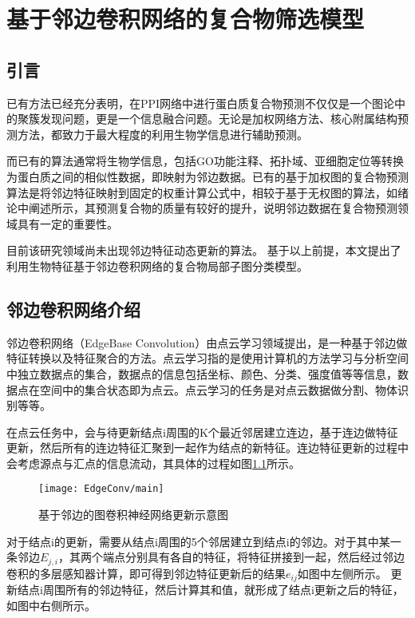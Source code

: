 \chapter{基于邻边卷积网络的复合物筛选模型}
\label{chapter:EdgeConv}
\section{引言}
\label{section:EdgeConv:Put}

已有方法已经充分表明，在PPI网络中进行蛋白质复合物预测不仅仅是一个图论中的聚簇发现问题，更是一个信息融合问题。无论是加权网络方法、核心附属结构预测方法，都致力于最大程度的利用生物学信息进行辅助预测。

而已有的算法通常将生物学信息，包括GO功能注释、拓扑域、亚细胞定位等转换为蛋白质之间的相似性数据，即映射为邻边数据。已有的基于加权图的复合物预测算法是将邻边特征映射到固定的权重计算公式中，相较于基于无权图的算法，如绪论中阐述所示，其预测复合物的质量有较好的提升，说明邻边数据在复合物预测领域具有一定的重要性。

目前该研究领域尚未出现邻边特征动态更新的算法。
基于以上前提，本文提出了利用生物特征基于邻边卷积网络的复合物局部子图分类模型。

\section{邻边卷积网络介绍}
\label{section:EdgeConv:intro}

邻边卷积网络（EdgeBase Convolution）由点云学习领域提出，是一种基于邻边做特征转换以及特征聚合的方法。点云学习指的是使用计算机的方法学习与分析空间中独立数据点的集合，数据点的信息包括坐标、颜色、分类、强度值等等信息，数据点在空间中的集合状态即为点云。点云学习的任务是对点云数据做分割、物体识别等等。

在点云任务中，会与待更新结点i周围的K个最近邻居建立连边，基于连边做特征更新，然后所有的连边特征汇聚到一起作为结点的新特征。连边特征更新的过程中会考虑源点与汇点的信息流动，其具体的过程如图\ref{fig:EdgeConv/main}所示。
\begin{figure}[htbp]
    \centering
    \texttt{[image: EdgeConv/main]}
    \caption{基于邻边的图卷积神经网络更新示意图}
    \label{fig:EdgeConv/main}
\end{figure}
对于结点i的更新，需要从结点i周围的5个邻居建立到结点i的邻边。对于其中某一条邻边$E_{j,i}$，其两个端点分别具有各自的特征，将特征拼接到一起，然后经过邻边卷积的多层感知器计算，即可得到邻边特征更新后的结果$e_{ij}$如图中左侧所示。
更新结点i周围所有的邻边特征，然后计算其和值，就形成了结点i更新之后的特征，如图中右侧所示。




